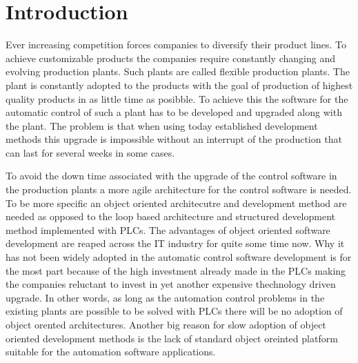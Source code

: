 
\chapter{Introduction}
\label{introduction}

Ever increasing competition forces companies to diversify
their product lines. To achieve customizable products the
companies require constantly changing and evolving
production plants. Such plants are called flexible
production plants. The plant is constantly adopted to the
products with the goal of production of highest quality
products in as little time as posibble. To achieve this the
software for the automatic control of such a plant has to be
developed and upgraded along with the plant. The problem is
that when using today established development methods this
upgrade is impossible without an interrupt of the production
that can last for several weeks in some cases.

To avoid the down time associated with the upgrade of the
control software in the production plants a more agile
architecture for the control software is needed. To be more
specific an object oriented architecutre and development
method are needed as opposed to the loop based architecture
and structured development method implemented with PLCs. The
advantages of object oriented software development are
reaped across the IT industry for quite some time now. Why
it has not been widely adopted in the automatic control
software development is for the most part because of the
high investment already made in the PLCs making the
companies reluctant to invest in yet another expensive
thechnology driven upgrade. In other words, as long as the
automation control problems in the existing plants are
possible to be solved with PLCs there will be no adoption of
object orented architectures. Another big reason for slow
adoption of object oriented development methods is the lack
of standard object oreinted platform suitable for the
automation software applications.
















